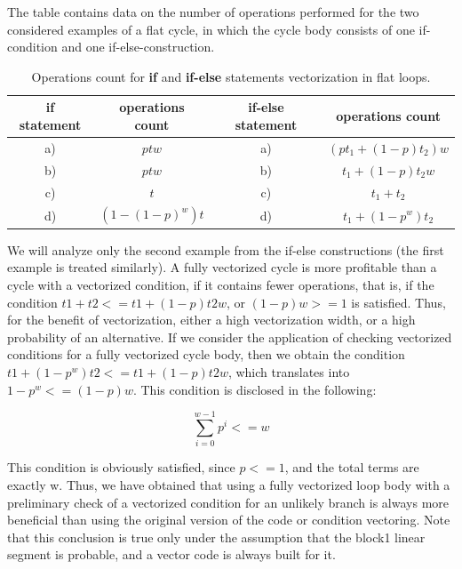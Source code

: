 \documentclass[
11pt,%
tightenlines,%
twoside,%
onecolumn,%
nofloats,%
nobibnotes,%
nofootinbib,%
superscriptaddress,%
noshowpacs,%
centertags]%
{revtex4}
\begin{document}
The table contains data on the number of operations performed for the two considered examples of a flat cycle, in which the cycle body consists of one if-condition and one if-else-construction.

\begin{table}[!h]
\setcaptionmargin{0mm}
\onelinecaptionsfalse
{}
\caption{Operations count for \textbf{if} and \textbf{if-else} statements vectorization in flat loops.}
\bigskip
\begin{tabular}{|c|c|c|c|}
\hline
\textbf{if} statement & operations count & \textbf{if-else} statement & operations count \\
\hline
a) & $ptw$ & a) & $\left( pt_1 + (1 - p)t_2 \right)w$ \\
b) & $ptw$ & b) & $t_1 + (1 - p)t_2w$ \\
c) & $t$ & c) & $t_1 + t_2$ \\
d) & $\left( 1 - (1 - p)^w \right)t$ & d) & $t_1 + (1 - p^w)t_2$ \\
\hline
\end{tabular}
\end{table}

We will analyze only the second example from the if-else constructions (the first example is treated similarly). A fully vectorized cycle is more profitable than a cycle with a vectorized condition, if it contains fewer operations, that is, if the condition $t1 + t2 <= t1 + (1 - p) t2w$, or $(1 - p) w >= 1$ is satisfied. Thus, for the benefit of vectorization, either a high vectorization width, or a high probability of an alternative. If we consider the application of checking vectorized conditions for a fully vectorized cycle body, then we obtain the condition $t1 + (1 - p ^ w) t2 <= t1 + (1 - p) t2w$, which translates into $1 - p ^ w <= (1 - p) w$. This condition is disclosed in the following:

\begin{equation}
\sum_{i = 0}^{w - 1}{p^i} <= w
\end{equation}

This condition is obviously satisfied, since $p <= 1$, and the total terms are exactly w. Thus, we have obtained that using a fully vectorized loop body with a preliminary check of a vectorized condition for an unlikely branch is always more beneficial than using the original version of the code or condition vectoring. Note that this conclusion is true only under the assumption that the block1 linear segment is probable, and a vector code is always built for it.
\end{document}
